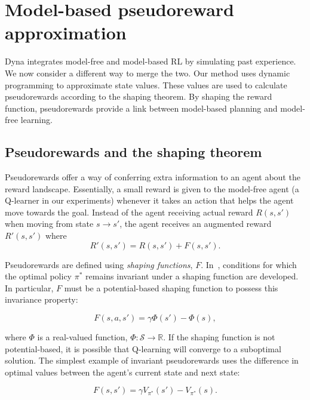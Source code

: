 \documentclass[letterpaper]{article}
\begin{document}
\section{Model-based pseudoreward approximation}

Dyna integrates model-free and model-based RL by simulating past experience. We now consider a different way to merge the two. Our method uses dynamic programming to approximate state values. These values are used to calculate pseudorewards according to the shaping theorem. By shaping the reward function, pseudorewards provide a link between model-based planning and model-free learning.

\subsection{Pseudorewards and the shaping theorem}

Pseudorewards offer a way of conferring extra information to an agent about the reward landscape. Essentially, a small reward is given to the model-free agent (a Q-learner in our experiments) whenever it takes an action that helps the agent move towards the goal. Instead of the agent receiving actual reward $R(s, s')$ when moving from state $s \rightarrow s'$, the agent receives an augmented reward $R'(s, s')$ where
\begin{equation}
R'(s, s') = R(s, s') + F(s, s').
\end{equation} 

Pseudorewards are defined using \textit{shaping functions}, $F$.  In~\cite{ng1999policy}, conditions for which the optimal policy $\pi^*$ remains invariant under a shaping function are developed. In particular, $F$ must be a potential-based shaping function to possess this invariance property:

\begin{equation}
F(s, a,s') = \gamma \Phi(s') - \Phi(s) ,
\end{equation}

\noindent
where $\Phi$ is a real-valued function, $\Phi : \mathcal{S} \rightarrow \mathbb{R}$. If the shaping function is not potential-based, it is possible that Q-learning will converge to a suboptimal solution. The simplest example of invariant pseudorewards uses the difference in optimal values between the agent's current state and next state:

\begin{equation}
F(s, s') = \gamma V_{\pi^*}(s') - V_{\pi^*}(s) .
\end{equation}
\end{document}
